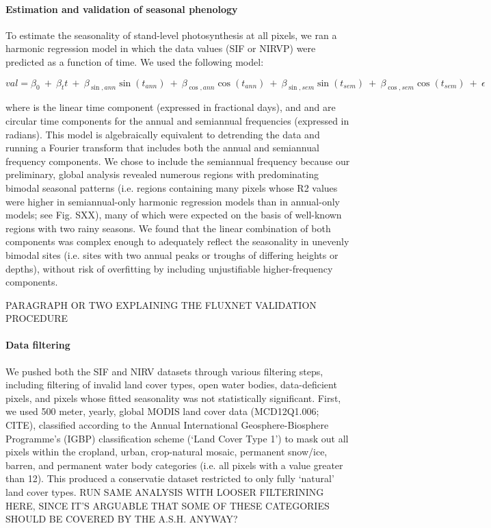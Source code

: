 \documentclass[12pt]{article}
\begin{document}
\paragraph*{Estimation and validation of seasonal phenology}

To estimate the seasonality of stand-level photosynthesis at all pixels,
we ran a harmonic regression model in which the data values (SIF or
NIRVP) were predicted as a function of time. We used the following model:

$$val=\beta _0\ +\ \beta _tt\ +\ \beta _{\sin ,ann}\sin (t_{ann})\ +\ \beta _{\cos ,ann}\cos (t_{ann})\ +\ \beta _{\sin ,sem}\sin (t_{sem})\ +\ \beta _{\cos ,sem}\cos (t_{sem})\ +\ \epsilon$$

where  is the linear time component (expressed in fractional days), and 
and  are circular time components for the annual and semiannual
frequencies (expressed in radians). This model is algebraically
equivalent to detrending the data and running a Fourier transform that
includes both the annual and semiannual frequency components. We chose to
include the semiannual frequency because our preliminary, global analysis
revealed numerous regions with predominating bimodal seasonal patterns
(i.e. regions containing many pixels whose R2 values were higher in
semiannual-only harmonic regression models than in annual-only models;
see Fig. SXX), many of which were expected on the basis of well-known
regions with two rainy seasons. We found that the linear combination of
both components was complex enough to adequately reflect the seasonality
in unevenly bimodal sites (i.e. sites with two annual peaks or troughs of
differing heights or depths), without risk of overfitting by including
unjustifiable higher-frequency components.

PARAGRAPH OR TWO EXPLAINING THE FLUXNET VALIDATION PROCEDURE

\paragraph*{Data filtering}
We pushed both the SIF and NIRV datasets through various filtering steps,
including filtering of invalid land cover types, open water bodies,
data-deficient pixels, and pixels whose fitted seasonality was not
statistically significant. First, we used 500 meter, yearly, global MODIS
land cover data (MCD12Q1.006; CITE), classified according to the Annual
International Geosphere-Biosphere Programme’s (IGBP) classification
scheme (‘Land Cover Type 1’) to mask out all pixels within the cropland,
urban, crop-natural mosaic, permanent snow/ice, barren, and permanent
water body categories (i.e. all pixels with a value greater than 12).
This produced a conservatie dataset restricted to only fully ‘natural’
land cover types. RUN SAME ANALYSIS WITH LOOSER FILTERINING HERE, SINCE
IT’S ARGUABLE THAT SOME OF THESE CATEGORIES SHOULD BE COVERED BY THE
A.S.H. ANYWAY?
\end{document}
